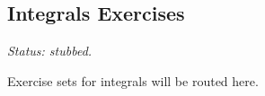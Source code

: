 \subsection*{Integrals Exercises}

\textit{Status: stubbed.}

Exercise sets for integrals will be routed here.
